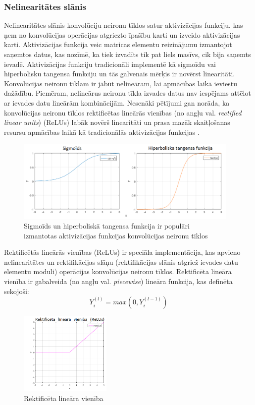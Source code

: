 \subsubsection{Nelinearitātes slānis}
Nelinearitātes slānis konvolūciju neironu tīklos satur aktivizācijas funkciju, kas ņem no konvolūcijas operācijas atgriezto īpašību karti un izveido aktivizācijas karti. Aktivizācijas funkcija veic matricas elementu reizinājumu izmantojot saņemtos datus, kas nozīmē, ka tiek izvadīts tik pat liels masīvs, cik bija saņemts ievadē. Aktivizācijas funkciju tradicionāli implementē kā sigmoīdu vai hiperbolisku tangensa funkciju un tās galvenais mērķis ir novērst linearitāti. Konvolūcijas neironu tīklam ir jābūt nelineāram, lai apmācības laikā ieviestu dažādību. Piemēram, nelineārus neironu tīkla izvades datus nav iespējams attēlot ar ievades datu lineārām kombinācijām. Nesenāki pētījumi gan norāda, ka konvolūcijas neironu tīklos rektificētas lineārās vienības (no angļu val. \textit{rectified linear units}) (ReLUs) labāk novērš linearitāti un prasa mazāk skaitļošanas resursu apmācības laikā kā tradicionālās aktivizācijas funkcijas \cite{nair2010rectified}. 
\begin{figure}[H]%
	\centering
	\includegraphics[height=4cm]{images/sigmoidhiperbol.png} %
	\caption{Sigmoīds un hiperboliskā tangensa funkcija ir populāri\\ izmantotas aktivizācijas funkcijas konvolūcijas neironu tīklos}%
	\label{fig:example}%
\end{figure}

Rektificētās lineārās vienības (ReLUs) ir speciāla implementācija, kas apvieno nelinearitātes un rektifikācijas slāņu (rektifikācijas slānis atgriež ievades datu elementu moduli) operācijas konvolūcijas neironu tīklos. Rektificēta lineāra vienība ir gabalveida (no angļu val. \textit{piecewise}) lineāra funkcija, kas definēta sekojoši:
\[ Y_i^{(l)} = max(0,Y_i^{(l-1)}) \]
\begin{figure}[H]%
	\centering
	\includegraphics[height=4cm]{images/relu.png} %
	\caption{Rektificēta lineāra vienība}%
	\label{fig:example}%
\end{figure}

